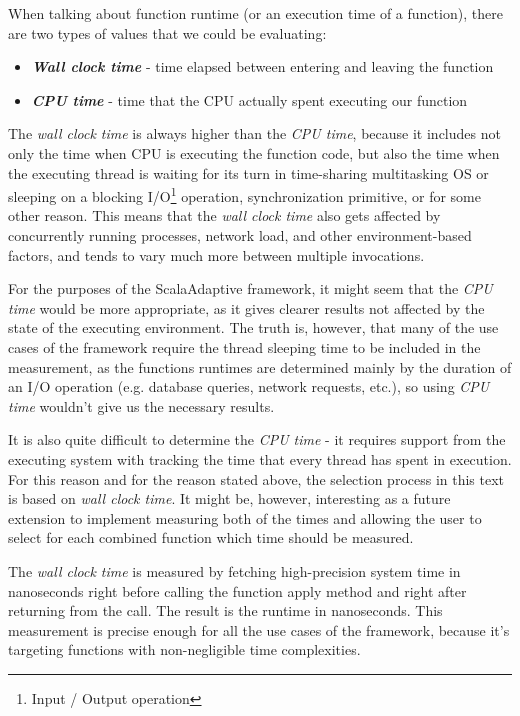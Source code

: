 When talking about function runtime (or an execution time of a function), there are two types of values that we could be evaluating:

\begin{itemize}
	\item \textbf{\textit{Wall clock time}} - time elapsed between entering and leaving the function
	\item \textbf{\textit{CPU time}} - time that the CPU actually spent executing our function
\end{itemize}

The \textit{wall clock time} is always higher than the \textit{CPU time}, because it includes not only the time when CPU is executing the function code, but also the time when the executing thread is waiting for its turn in time-sharing multitasking OS or sleeping on a blocking I/O\footnote{Input / Output operation} operation, synchronization primitive, or for some other reason. This means that the \textit{wall clock time} also gets affected by concurrently running processes, network load, and other environment-based factors, and tends to vary much more between multiple invocations.

For the purposes of the ScalaAdaptive framework, it might seem that the \textit{CPU time} would be more appropriate, as it gives clearer results not affected by the state of the executing environment. The truth is, however, that many of the use cases of the framework require the thread sleeping time to be included in the measurement, as the functions runtimes are determined mainly by the duration of an I/O operation (e.g. database queries, network requests, etc.), so using \textit{CPU time} wouldn't give us the necessary results.

It is also quite difficult to determine the \textit{CPU time} - it requires support from the executing system with tracking the time that every thread has spent in execution. For this reason and for the reason stated above, the selection process in this text is based on \textit{wall clock time}. It might be, however, interesting as a future extension to implement measuring both of the times and allowing the user to select for each combined function which time should be measured.

The \textit{wall clock time} is measured by fetching high-precision system time in nanoseconds right before calling the function apply method and right after returning from the call. The result is the runtime in nanoseconds. This measurement is precise enough for all the use cases of the framework, because it's targeting functions with non-negligible time complexities.

